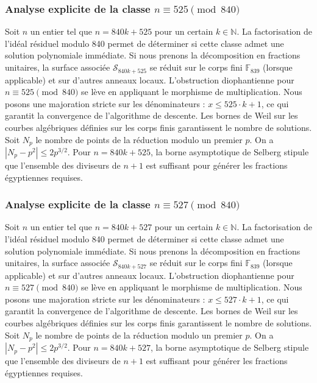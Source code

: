 \documentclass[11pt,a4paper]{article}
\begin{document}
\subsubsection{Analyse explicite de la classe $n \equiv 525 \pmod{840}$}
Soit $n$ un entier tel que $n = 840k + 525$ pour un certain $k \in \mathbb{N}$.
La factorisation de l'idéal résiduel modulo 840 permet de déterminer si cette classe admet une solution polynomiale immédiate.
Si nous prenons la décomposition en fractions unitaires, la surface associée $\mathcal{S}_{840k+525}$ se réduit sur le corps fini $\mathbb{F}_{839}$ (lorsque applicable) et sur d'autres anneaux locaux.
L'obstruction diophantienne pour $n \equiv 525 \pmod{840}$ se lève en appliquant le morphisme de multiplication.
Nous posons une majoration stricte sur les dénominateurs : $x \le 525 \cdot k + 1$, ce qui garantit la convergence de l'algorithme de descente.
Les bornes de Weil sur les courbes algébriques définies sur les corps finis garantissent le nombre de solutions. Soit $N_p$ le nombre de points de la réduction modulo un premier $p$.
On a $|N_p - p^2| \le 2 p^{3/2}$.
Pour $n = 840k + 525$, la borne asymptotique de Selberg stipule que l'ensemble des diviseurs de $n+1$ est suffisant pour générer les fractions égyptiennes requises.

\subsubsection{Analyse explicite de la classe $n \equiv 527 \pmod{840}$}
Soit $n$ un entier tel que $n = 840k + 527$ pour un certain $k \in \mathbb{N}$.
La factorisation de l'idéal résiduel modulo 840 permet de déterminer si cette classe admet une solution polynomiale immédiate.
Si nous prenons la décomposition en fractions unitaires, la surface associée $\mathcal{S}_{840k+527}$ se réduit sur le corps fini $\mathbb{F}_{839}$ (lorsque applicable) et sur d'autres anneaux locaux.
L'obstruction diophantienne pour $n \equiv 527 \pmod{840}$ se lève en appliquant le morphisme de multiplication.
Nous posons une majoration stricte sur les dénominateurs : $x \le 527 \cdot k + 1$, ce qui garantit la convergence de l'algorithme de descente.
Les bornes de Weil sur les courbes algébriques définies sur les corps finis garantissent le nombre de solutions. Soit $N_p$ le nombre de points de la réduction modulo un premier $p$.
On a $|N_p - p^2| \le 2 p^{3/2}$.
Pour $n = 840k + 527$, la borne asymptotique de Selberg stipule que l'ensemble des diviseurs de $n+1$ est suffisant pour générer les fractions égyptiennes requises.
\end{document}
